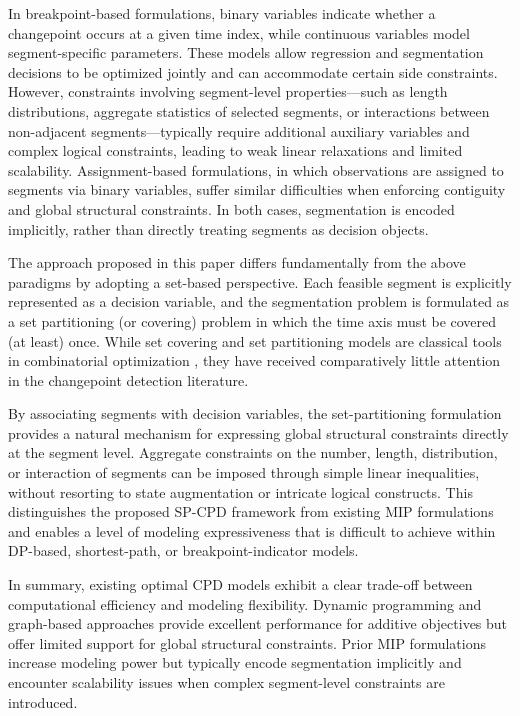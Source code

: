 \documentclass[preprints,article,submit,pdftex,moreauthors]{Definitions/mdpi}
\begin{document}
In breakpoint-based formulations, binary variables indicate whether a changepoint occurs at a given time index, while continuous variables model segment-specific parameters. These models allow regression and segmentation decisions to be optimized jointly and can accommodate certain side constraints. However, constraints involving segment-level properties—such as length distributions, aggregate statistics of selected segments, or interactions between non-adjacent segments—typically require additional auxiliary variables and complex logical constraints, leading to weak linear relaxations and limited scalability.
Assignment-based formulations, in which observations are assigned to segments via binary variables, suffer similar difficulties when enforcing contiguity and global structural constraints. In both cases, segmentation is encoded implicitly, rather than directly treating segments as decision objects.

The approach proposed in this paper differs fundamentally from the above paradigms by adopting a set-based perspective. Each feasible segment is explicitly represented as a decision variable, and the segmentation problem is formulated as a set partitioning (or covering) problem in which the time axis must be covered (at least) once. While set covering and set partitioning models are classical tools in combinatorial optimization \cite{B69,S03}, they have received comparatively little attention in the changepoint detection literature.

By associating segments with decision variables, the set-partitioning formulation provides a natural mechanism for expressing global structural constraints directly at the segment level. Aggregate constraints on the number, length, distribution, or interaction of segments can be imposed through simple linear inequalities, without resorting to state augmentation or intricate logical constructs. This distinguishes the proposed SP-CPD framework from existing MIP formulations and enables a level of modeling expressiveness that is difficult to achieve within DP-based, shortest-path, or breakpoint-indicator models.

In summary, existing optimal CPD models exhibit a clear trade-off between computational efficiency and modeling flexibility. Dynamic programming and graph-based approaches provide excellent performance for additive objectives but offer limited support for global structural constraints. Prior MIP formulations increase modeling power but typically encode segmentation implicitly and encounter scalability issues when complex segment-level constraints are introduced.
\end{document}
